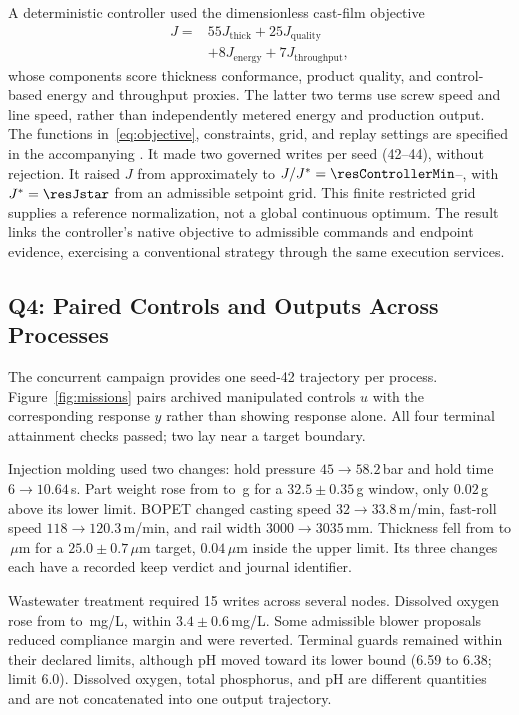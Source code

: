 \label{sec:controller}
A deterministic controller used the dimensionless cast-film objective
\begin{equation}
\begin{aligned}
J={}&55J_{\mathrm{thick}}+25J_{\mathrm{quality}}\\
&+8J_{\mathrm{energy}}+7J_{\mathrm{throughput}},
\end{aligned}
\label{eq:objective}
\end{equation}
whose components score thickness conformance, product quality, and
control-based energy and throughput proxies. The latter two terms use
screw speed and line speed, rather than independently metered energy and
production output. The functions in~\eqref{eq:objective}, constraints, grid,
and replay settings are specified in the accompanying .
It made two governed writes
per seed (42--44), without rejection. It raised $J$ from approximately
\resJzero{} to $J/J^*=\resControllerMin$--\resControllerMax{}, with
$J^*=\resJstar$ from an admissible setpoint grid. This finite restricted grid
supplies a reference normalization, not a global continuous optimum.
The result links the controller's native objective to admissible commands
and endpoint evidence, exercising a conventional strategy through the
same execution services.

\subsection{Q4: Paired Controls and Outputs Across Processes}
\label{sec:scenarios}
The concurrent campaign provides one seed-42 trajectory per process.
Figure~\ref{fig:missions} pairs archived manipulated controls $u$ with the
corresponding response $y$ rather than showing response alone. All four
terminal attainment checks passed; two lay near a target boundary.

Injection molding used two changes: hold pressure
$45\rightarrow58.2$\,bar and hold time $6\rightarrow10.64$\,s. Part weight
rose from \resInjStart{} to \resInjFinal{}\,g for a
$32.5\pm0.35$\,g window, only $0.02$\,g above its lower limit.
BOPET changed casting speed $32\rightarrow33.8$\,m/min, fast-roll speed
$118\rightarrow120.3$\,m/min, and rail width $3000\rightarrow3035$\,mm.
Thickness fell from \resBiaxStart{} to \resBiaxFinal{}\,$\mu$m for a
$25.0\pm0.7$\,$\mu$m target, $0.04$\,$\mu$m inside the upper limit.
Its three changes each have a recorded keep verdict and journal identifier.

Wastewater treatment required 15 writes across several nodes. Dissolved
oxygen rose from \resWwtpStart{} to \resWwtpFinal{}\,mg/L, within
$3.4\pm0.6$\,mg/L. Some admissible blower proposals reduced compliance
margin and were reverted. Terminal guards remained within their declared
limits, although pH moved toward its lower bound (6.59 to 6.38; limit 6.0).
Dissolved oxygen, total phosphorus, and pH are different quantities and are
not concatenated into one output trajectory.

